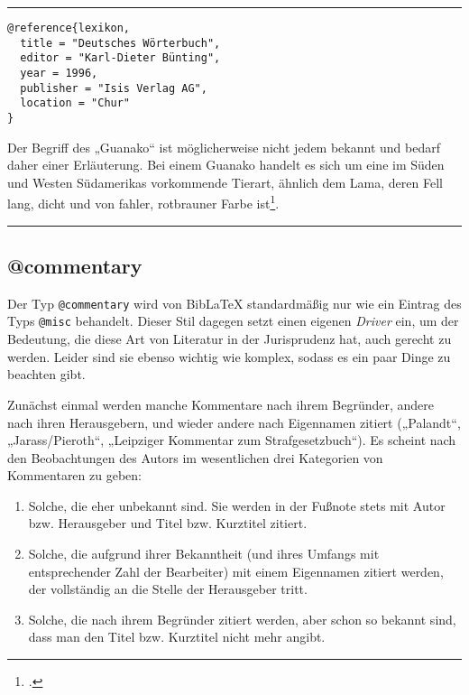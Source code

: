 \documentclass[11pt,a4paper,DIV=calc,draft]{scrartcl}
\newcommand\software[1]{\textsf{#1}}
\newcommand\Biblatex{\software{Bib\LaTeX{}}\xspace}
\newenvironment{rubexample}{\par\vspace{\baselineskip}\hrule\par\begin{refsection}}{\end{refsection}\par\hrule\par\vspace{\baselineskip}}
\begin{document}
\begin{rubexample}
\begin{verbatim}
@reference{lexikon,
  title = "Deutsches Wörterbuch",
  editor = "Karl-Dieter Bünting",
  year = 1996,
  publisher = "Isis Verlag AG",
  location = "Chur"
}
\end{verbatim}

Der Begriff des „Guanako“ ist möglicherweise nicht jedem bekannt und
bedarf daher einer Erläuterung. Bei einem Guanako handelt es sich um
eine im Süden und Westen Südamerikas vorkommende Tierart, ähnlich dem
Lama, deren Fell lang, dicht und von fahler, rotbrauner Farbe
ist\footcite[480]{lexikon}.

\printbibliography
\end{rubexample}

\subsection{@commentary}

Der Typ \verb+@commentary+ wird von \Biblatex standardmäßig nur wie
ein Eintrag des Typs \verb+@misc+ behandelt. Dieser Stil dagegen
setzt einen eigenen \emph{Driver} ein, um der Bedeutung, die diese Art
von Literatur in der Jurisprudenz hat, auch gerecht zu werden. Leider
sind sie ebenso wichtig wie komplex, sodass es ein paar Dinge zu
beachten gibt.

Zunächst einmal werden manche Kommentare nach ihrem Begründer, andere
nach ihren Herausgebern, und wieder andere nach Eigennamen zitiert
(„Palandt“, „Jarass/Pieroth“, „Leipziger Kommentar zum
Strafgesetzbuch“). Es scheint nach den Beobachtungen des Autors im
wesentlichen drei Kategorien von Kommentaren zu geben:

\begin{enumerate}
\item Solche, die eher unbekannt sind. Sie werden in der Fußnote stets
  mit Autor bzw. Herausgeber und Titel bzw. Kurztitel zitiert.
\item Solche, die aufgrund ihrer Bekanntheit (und ihres Umfangs mit
  entsprechender Zahl der Bearbeiter) mit einem Eigennamen zitiert
  werden, der vollständig an die Stelle der Herausgeber tritt.
\item Solche, die nach ihrem Begründer zitiert werden, aber schon so
  bekannt sind, dass man den Titel bzw. Kurztitel nicht mehr angibt.
\end{enumerate}
\end{document}
